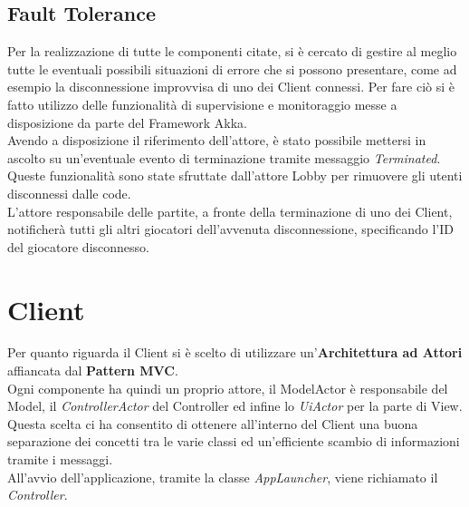 \subsection{Fault Tolerance}
Per la realizzazione di tutte le componenti citate, si \`e cercato di gestire al meglio tutte le eventuali possibili situazioni di errore che si possono presentare, come ad esempio la disconnessione improvvisa di uno dei Client connessi. Per fare ci\`o si \`e fatto utilizzo delle funzionalit\`a di supervisione e monitoraggio messe a disposizione da parte del Framework Akka.\\
Avendo a disposizione il riferimento dell'attore, \`e stato possibile mettersi in ascolto su un'eventuale evento di terminazione tramite messaggio \textit{Terminated}. Queste funzionalit\`a sono state sfruttate dall'attore Lobby per rimuovere gli utenti disconnessi dalle code.\\
L'attore responsabile delle partite, a fronte della terminazione di uno dei Client, notificher\`a tutti gli altri giocatori dell'avvenuta disconnessione, specificando l'ID del giocatore disconnesso.

\section{Client}
Per quanto riguarda il Client si \`e scelto di utilizzare un'\textbf{Architettura ad Attori} affiancata dal \textbf{Pattern MVC}.\\
Ogni componente ha quindi un proprio attore, il ModelActor \`e responsabile del Model, il \textit{ControllerActor} del Controller ed infine lo \textit{UiActor} per la parte di View.\\
Questa scelta ci ha consentito di ottenere all'interno del Client una buona separazione dei concetti tra le varie classi ed un'efficiente scambio di informazioni tramite i messaggi.\\
All'avvio dell'applicazione, tramite la classe \textit{AppLauncher}, viene richiamato il \textit{Controller}.

